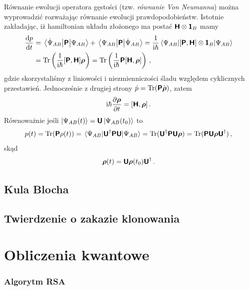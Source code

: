 \documentclass{myclass}
\begin{document}
Równanie ewolucji operatora gęstości (tzw. \textit{równanie Von Neumanna}) można wyprowadzić
rozważając równanie ewolucji prawdopodobieństw. Istotnie zakładając, iż hamiltonian układu złożonego
ma postać \(\boldsymbol{\mathsf{H}}\otimes\boldsymbol{\mathsf{1}}_B\) mamy
\begin{equation*}
    \begin{split}
        \dv{p}{t} &= \mel{\dot{\Psi}_{AB}}{\oper{P}}{\Psi_{AB}} + \mel{\Psi_{AB}}{\oper{P}}{\dot{\Psi}_{AB}} = \frac{1}{\im\hbar} \mel{\Psi_{AB}}{[\oper{P}, \oper{H}]\otimes\oper{1}_B}{\Psi_{AB}}\\
        &= \Trace\left(\frac{1}{\im\hbar}[\oper{P}, \oper{H}]\oper{\rho}\right) = \Trace\left(\frac{1}{\im\hbar}\oper{P}[\oper{H}, \oper{\rho}]\right)\,,
    \end{split}
\end{equation*}
gdzie skorzystaliśmy z liniowości i niezmienniczości śladu względem cyklicznych przestawień.
Jednocześnie z drugiej strony \(\dot{p} = \Trace(\oper{P}\dot{\oper{\rho}})\), zatem
\begin{equation*}
    \mathrm{i}\hbar\pdv{\boldsymbol{\mathsf{\rho}}}{t} = [\boldsymbol{\mathsf{H}}, \boldsymbol{\mathsf{\rho}}]\,.
\end{equation*}
Równoważnie jeśli \(\ket{\Psi_{AB}(t)} = \boldsymbol{\mathsf{U}}\ket{\Psi_{AB}(t_0)}\) to
\begin{equation*}
    p(t) = \Trace(\oper{P}\rho(t)) = \mel{\Psi_{AB}}{\oper{U}^\dagger\oper{P}\oper{U}}{\Psi_{AB}} = \Trace(\oper{U}^\dagger\oper{P}\oper{U}\oper{\rho})= \Trace(\oper{P}\oper{U}\oper{\rho}\oper{U}^\dagger)\,,
\end{equation*}
skąd
\begin{equation*}
    \boldsymbol{\mathsf{\rho}}(t) = \boldsymbol{\mathsf{U}}\boldsymbol{\mathsf{\rho}}(t_0)\boldsymbol{\mathsf{U}}^\dagger\,.
\end{equation*}

\subsection{Kula Blocha}

\subsection{Twierdzenie o zakazie klonowania}


\section{Obliczenia kwantowe}

\subsubsection*{Algorytm RSA}
\end{document}
